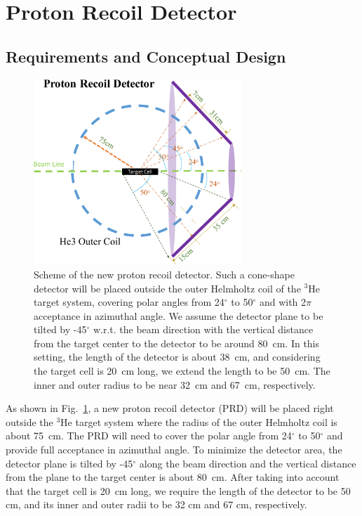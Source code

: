 \section{Proton Recoil Detector}

\subsection{Requirements and Conceptual Design}

\begin{figure}[!ht]
 \begin{center}
  \includegraphics[width=0.7\textwidth]{./figures/PRD-crop.pdf}
   \caption[Scheme of the new proton recoil detector ]{\footnotesize{Scheme of
       the new proton recoil detector. Such a cone-shape detector will be
       placed outside the outer Helmholtz coil of the $\mathrm{^{3}He}$ target
       system, covering polar angles from 24$^{\circ}$ to 50$^{\circ}$ and with
       2$\pi$ acceptance in azimuthal angle. We assume the detector plane
       to be tilted by -45$^{\circ}$ w.r.t. the beam direction with the
       vertical distance from the target center to the detector to be around
       80~cm. In this setting, the length of the detector is about 38~cm, and
       considering the target cell is 20~cm long, we extend the length to be
       50~cm. The inner and outer radius to be near 32~cm and 67~cm,
       respectively.}}
   \label{prd_concept}
 \end{center}
\end{figure}
As shown in Fig.~\ref{prd_concept}, a new proton recoil detector (PRD) will be
placed right outside the $\mathrm{^{3}He}$ target system where the radius of
the outer Helmholtz coil is about 75~cm. The PRD will need to cover the polar
angle from 24$^{\circ}$ to 50$^{\circ}$ and provide full acceptance in
azimuthal angle. To minimize the detector area, the detector plane is tilted by
-45$^{\circ}$ along the beam direction and the vertical distance from the plane
to the target center is about 80~cm. After taking into account that the target
cell is 20~cm long, we require the length of the detector to be 50 cm, and its
inner and outer radii to be 32 cm and 67 cm, respectively.

